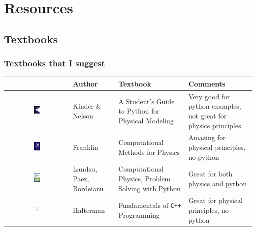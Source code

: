 \documentclass[hyperref={colorlinks=true}]{beamer}
\begin{document}
\section[Resources]{Resources}

\subsection[Textbooks]{Textbooks}

\begin{frame}[shrink=15]
  \frametitle{Textbooks that I suggest}

  \begin{table}[htbp]
  \centering
  \begin{tabular}{@{} cp{3cm}p{6cm}p{4cm} @{}}
    \hline
     & Author & Textbook & Comments \\ 
    \hline
    \includegraphics[width=0.10\textwidth]{Textbook-KN.png} & Kinder \& Nelson & A Student's Guide to Python for Physical Modeling & Very good for python examples, not great for physics principles \\ 
    \includegraphics[width=0.10\textwidth]{Textbook-Franklin.jpg} & Franklin & Computational Methods for Physics & Amazing for physical principles, no python \\ 
    \includegraphics[width=0.10\textwidth]{Textbook-LPB.jpg} & Landau, Paez, Bordeianu  & Computational Physics, Problem Solving with Python & Great for both physics and python \\ 
    \includegraphics[width=0.10\textwidth]{Textbook-Halterman.pdf} & Halterman & Fundamentals of \texttt{C++} Programming & Great for physical principles, no python \\ 
    \hline
  \end{tabular}
  \end{table}
  
  
\end{frame}
\end{document}
